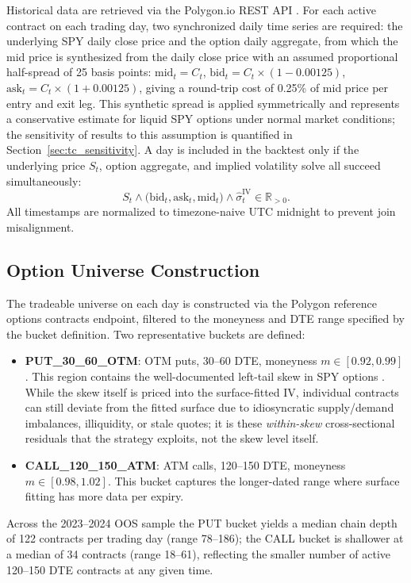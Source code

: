 \documentclass[10pt,twocolumn]{article}
\begin{document}
Historical data are retrieved via the Polygon.io REST API
\cite{polygon2024}. For each active contract on each trading day, two
synchronized daily time series are required: the underlying SPY daily
close price and the option daily aggregate, from which the mid price is
synthesized from the daily close price with an assumed proportional
half-spread of 25 basis points: $\text{mid}_t = C_t$,
$\text{bid}_t = C_t \times (1 - 0.00125)$,
$\text{ask}_t = C_t \times (1 + 0.00125)$, giving a round-trip cost of
0.25\% of mid price per entry and exit leg.  This synthetic spread is applied
symmetrically and represents a conservative estimate for liquid SPY options
under normal market conditions; the sensitivity of results to this assumption
is quantified in Section~\ref{sec:tc_sensitivity}.  A day is included in
the backtest only if the underlying price $S_t$, option aggregate, and
implied volatility solve all succeed simultaneously:
%
\begin{equation}
S_t \land \bigl(\text{bid}_t, \text{ask}_t, \text{mid}_t\bigr)
    \land \hat{\sigma}_{t}^{\text{IV}} \in \mathbb{R}_{>0}.
\end{equation}
%
All timestamps are normalized to timezone-naive UTC midnight to
prevent join misalignment.

\subsection{Option Universe Construction}

The tradeable universe on each day is constructed via the Polygon reference
options contracts endpoint, filtered to the moneyness and DTE range specified
by the bucket definition. Two representative buckets are defined:
%
\begin{itemize}[noitemsep]
  \item \textbf{PUT\_30\_60\_OTM}: OTM puts, 30--60 DTE, moneyness
        $m \in [0.92, 0.99]$. This region contains the well-documented
        left-tail skew in SPY options \cite{broadie2009}. While the skew
        itself is priced into the surface-fitted IV, individual contracts
        can still deviate from the fitted surface due to idiosyncratic
        supply/demand imbalances, illiquidity, or stale quotes; it is
        these \emph{within-skew} cross-sectional residuals that the
        strategy exploits, not the skew level itself.
  \item \textbf{CALL\_120\_150\_ATM}: ATM calls, 120--150 DTE, moneyness
        $m \in [0.98, 1.02]$. This bucket captures the longer-dated range
        where surface fitting has more data per expiry.
\end{itemize}
Across the 2023--2024 OOS sample the PUT bucket yields a median chain depth
of 122 contracts per trading day (range 78--186); the CALL bucket is shallower
at a median of 34 contracts (range 18--61), reflecting the smaller number of
active 120--150 DTE contracts at any given time.
\end{document}
